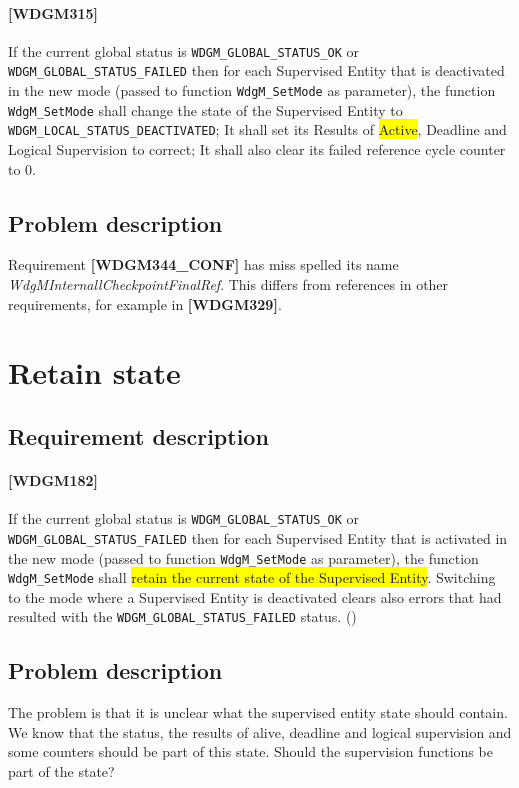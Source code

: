 \paragraph{[WDGM315]} If the current global status is
\lstinline!WDGM_GLOBAL_STATUS_OK! or
\lstinline!WDGM_GLOBAL_STATUS_FAILED! then for each Supervised Entity
that is deactivated in the new mode (passed to function
\lstinline!WdgM_SetMode! as parameter), the function
\lstinline!WdgM_SetMode! shall change the state of the Supervised
Entity to\\\lstinline!WDGM_LOCAL_STATUS_DEACTIVATED!; It shall set its
Results of \colorbox{yellow}{Active}, Deadline and Logical Supervision
to correct; It shall also clear its failed reference cycle counter to
0.

\subsection{Problem description}
Requirement \textbf{[WDGM344\_CONF]} has miss spelled its name
\textit{WdgMInternallCheckpointFinalRef}. This differs from references
in other requirements, for example in \textbf{[WDGM329]}.

\section{Retain state}
\subsection{Requirement description}
\paragraph{[WDGM182]} If the current global status is
\lstinline!WDGM_GLOBAL_STATUS_OK! or
\lstinline!WDGM_GLOBAL_STATUS_FAILED! then for each Supervised Entity
that is activated in the new mode (passed to function
\lstinline!WdgM_SetMode! as parameter), the function
\lstinline!WdgM_SetMode! shall \colorbox{yellow}{retain the current
state of the Supervised Entity}.  Switching to the mode where a
Supervised Entity is deactivated clears also errors that had resulted
with the \lstinline!WDGM_GLOBAL_STATUS_FAILED!  status. ()

\subsection{Problem description}
The problem is that it is unclear what the supervised entity state
should contain. We know that the status, the results of alive,
deadline and logical supervision and some counters should be part of
this state. Should the supervision functions be part of the state?

